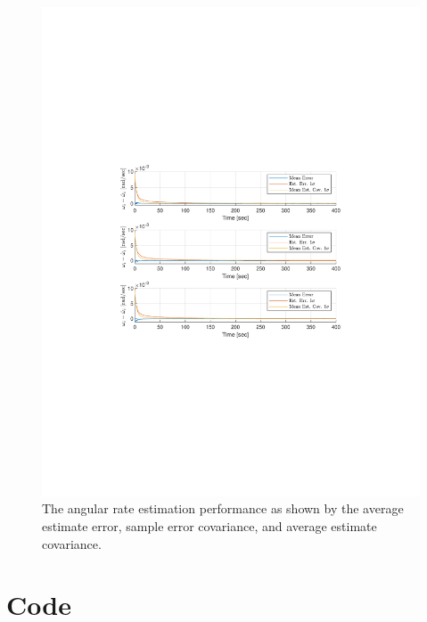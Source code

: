 \documentclass[]{article}
\begin{document}
\begin{figure}[!h]
	\centering
	\includegraphics[width=\linewidth,trim={4cm, 8cm, 4cm, 8cm},clip]{figs/MC_rate_est_perf.pdf}
	\caption{The angular rate estimation performance as shown by the average estimate error, sample error covariance, and average estimate covariance.}
	\label{fig:MC_rate_est_perf.pdf}
\end{figure}


\section{Code}



\end{document}
